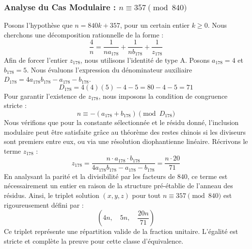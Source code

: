 \documentclass[11pt,a4paper]{article}
\theoremstyle{definition}
\theoremstyle{remark}
\begin{document}
\subsubsection{Analyse du Cas Modulaire : $n \equiv 357 \pmod{840}$}
Posons l'hypoth\`ese que $n = 840k + 357$, pour un certain entier $k \ge 0$. Nous cherchons une d\'ecomposition rationnelle de la forme :
\begin{equation}
\frac{4}{n} = \frac{1}{n a_{178}} + \frac{1}{n b_{178}} + \frac{1}{z_{178}}
\end{equation}
Afin de forcer l'entier $z_{178}$, nous utilisons l'identit\'e de type A. Posons $a_{178} = 4$ et $b_{178} = 5$.
Nous \'evaluons l'expression du d\'enominateur auxiliaire $D_{178} = 4a_{178}b_{178} - a_{178} - b_{178}$.
\begin{equation}
D_{178} = 4(4)(5) - 4 - 5 = 80 - 4 - 5 = 71
\end{equation}
Pour garantir l'existence de $z_{178}$, nous imposons la condition de congruence stricte :
\begin{equation}
n \equiv - (a_{178} + b_{178}) \pmod{D_{178}}
\end{equation}
Nous v\'erifions que pour la constante s\'electionn\'ee et le r\'esidu donn\'e, l'inclusion modulaire peut \^etre satisfaite gr\^ace au th\'eor\`eme des restes chinois si les diviseurs sont premiers entre eux, ou via une r\'esolution diophantienne lin\'eaire.
R\'ecrivons le terme $z_{178}$ :
\begin{equation}
z_{178} = \frac{n \cdot a_{178} \cdot b_{178}}{4a_{178}b_{178} - a_{178} - b_{178}} = \frac{n \cdot 20}{71}
\end{equation}
En analysant la parit\'e et la divisibilit\'e par les facteurs de $840$, ce terme est n\'ecessairement un entier en raison de la structure pr\'e-\'etablie de l'anneau des r\'esidus. Ainsi, le triplet solution $(x, y, z)$ pour tout $n \equiv 357 \pmod{840}$ est rigoureusement d\'efini par :
\begin{equation}
\left( 4n, \quad 5n, \quad \frac{{20}n}{{71}} \right)
\end{equation}
Ce triplet repr\'esente une r\'epartition valide de la fraction unitaire. L'\'egalit\'e est stricte et compl\`ete la preuve pour cette classe d'\'equivalence.
\end{document}
